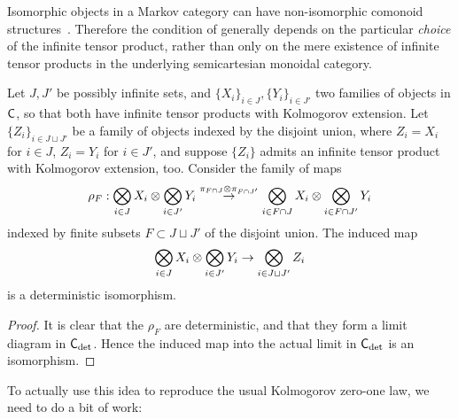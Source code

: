 \documentclass[11pt]{article}
\begin{document}
\begin{remark}
    Isomorphic objects in a Markov category can have non-isomorphic comonoid structures~\cite[Remark~10.9]{markov_cats}.
    Therefore the condition of  generally depends on the particular \emph{choice} of the infinite tensor product, rather than only on the mere existence of infinite tensor products in the underlying semicartesian monoidal category.
\end{remark}

\begin{lemma}
    Let $J,J'$ be possibly infinite sets, and $\{X_i\}_{i\in J}, \{Y_i\}_{i\in J'}$ two families of objects in $\mathsf{C}$, so that both have infinite tensor products with Kolmogorov extension.
    Let $\{Z_i\}_{i\in J \sqcup J'}$ be a family of objects indexed by the disjoint union, where $Z_i = X_i$ for $i\in J$, $Z_i = Y_i$ for $i \in J'$,
    and suppose $\{Z_i\}$ admits an infinite tensor product with Kolmogorov extension, too.
    Consider the family of maps
    \[\rho_F: \bigotimes_{i\in J}X_i \otimes \bigotimes_{i\in J'} Y_i \overset{\pi_{F \cap J} \otimes \pi_{F \cap J'}}{\to} \bigotimes_{i \in F \cap J}X_i \otimes \bigotimes_{i\in F \cap J'}Y_i\]
    indexed by finite subsets $F \subset J \sqcup J'$ of the disjoint union.
    The induced map
    \[\bigotimes_{i\in J}X_i \otimes \bigotimes_{i\in J'} Y_i \to \bigotimes_{i \in J \sqcup J'} Z_i\]
    is a deterministic isomorphism.
\end{lemma}
\begin{proof}
    It is clear that the $\rho_F$ are deterministic, and that they form a limit diagram in $\mathsf{C}_{\rm det}$.
    Hence the induced map into the actual limit in $\mathsf{C}_{\rm det}$ is an isomorphism.
\end{proof}


To actually use this idea to reproduce the usual Kolmogorov zero-one law, we need to do a bit of work:
\end{document}
